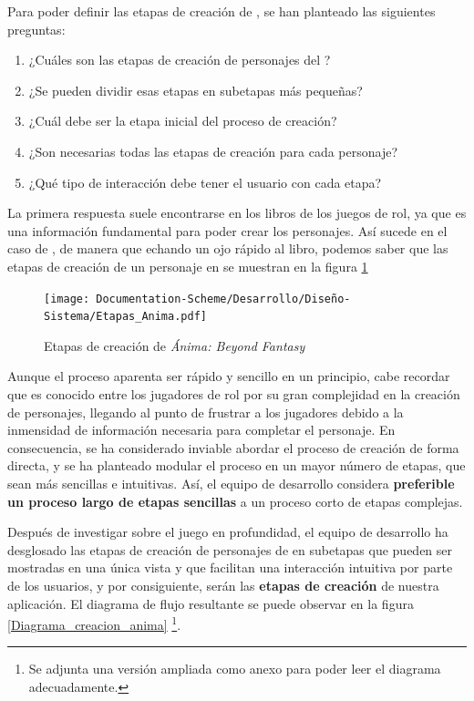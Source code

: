 Para poder definir las etapas de creación de \anima, se han planteado las siguientes preguntas:

\begin{enumerate}
    \item ¿Cuáles son las etapas de creación de personajes del \anima?
    \item ¿Se pueden dividir esas etapas en subetapas más pequeñas?
    \item ¿Cuál debe ser la etapa inicial del proceso de creación?
    \item ¿Son necesarias todas las etapas de creación para cada personaje?
    \item ¿Qué tipo de interacción debe tener el usuario con cada etapa?
\end{enumerate}

La primera respuesta suele encontrarse en los libros de los juegos de rol, ya que es una información 
fundamental para poder crear los personajes. Así sucede en el caso de \anima, de manera que 
echando un ojo rápido al libro, podemos saber que las etapas de creación de un personaje en \anima
se muestran en la figura \ref*{Etapas_anima}\medskip

\begin{figure}[H]
    \centering
    \texttt{[image: Documentation-Scheme/Desarrollo/Diseño-Sistema/Etapas\_Anima.pdf]}
    \caption{Etapas de creación de \textit{Ánima: Beyond Fantasy}}
    \label{Etapas_anima}
\end{figure}

Aunque el proceso aparenta ser rápido y sencillo en un principio, cabe recordar que \anima es conocido 
entre los jugadores de rol por su gran complejidad en la creación de personajes, llegando al punto de frustrar a 
los jugadores debido a la inmensidad de información necesaria para completar el personaje. En consecuencia, se 
ha considerado inviable abordar el proceso de creación de forma directa, y se ha planteado modular el proceso en 
un mayor número de etapas, que sean más sencillas e intuitivas. Así, el equipo de desarrollo considera 
\textbf{preferible un proceso largo de etapas sencillas} a un proceso corto de etapas complejas. \medskip

Después de investigar sobre el juego en profundidad, el equipo de desarrollo ha desglosado las etapas de 
creación de personajes de \anima en subetapas que pueden ser mostradas en una única vista y que 
facilitan una interacción intuitiva por parte de los usuarios, y por consiguiente, 
serán las \textbf{etapas de creación} de nuestra aplicación. El diagrama de flujo resultante se puede 
observar en la figura \ref*{Diagrama_creacion_anima} \footnote[1]{Se adjunta una versión ampliada como anexo 
para poder leer el diagrama adecuadamente.}.\medskip

